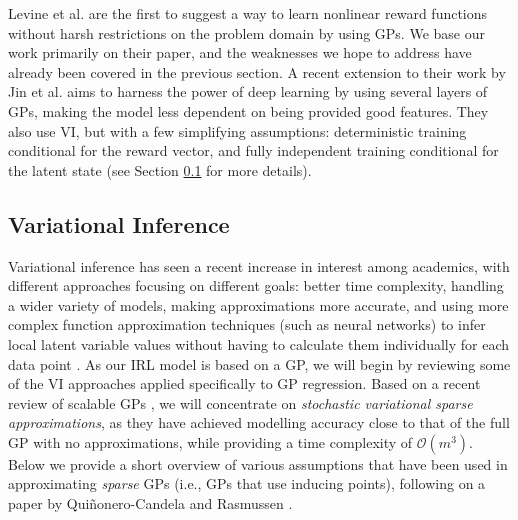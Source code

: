 \documentclass{mprop}
\theoremstyle{definition}
\begin{document}
Levine et al. \cite{DBLP:conf/nips/LevinePK11} are the first to suggest a way to
learn nonlinear reward functions without harsh restrictions on the problem
domain by using GPs. We base our work primarily on their paper, and the
weaknesses we hope to address have already been covered in the previous section.
A recent extension to their work by Jin et al. \cite{DBLP:conf/uai/JinDAS17}
aims to harness the power of deep learning by using several layers of GPs,
making the model less dependent on being provided good features. They also use
VI, but with a few simplifying assumptions: deterministic training conditional
for the reward vector, and fully independent training conditional for the latent
state (see Section \ref{sec:vi_literature} for more details).


\subsection{Variational Inference} \label{sec:vi_literature}

Variational inference has seen a recent increase in interest among academics,
with different approaches focusing on different goals: better time complexity,
handling a wider variety of models, making approximations more accurate, and
using more complex function approximation techniques (such as neural networks)
to infer local latent variable values without having to calculate them
individually for each data point \cite{DBLP:journals/corr/abs-1711-05597}. As
our IRL model is based on a GP, we will begin by reviewing some of the VI
approaches applied specifically to GP regression. Based on a recent review of
scalable GPs \cite{DBLP:journals/corr/abs-1711-05597}, we will concentrate on
\emph{stochastic variational sparse approximations}, as they have achieved
modelling accuracy close to that of the full GP with no approximations, while
providing a time complexity of $\mathcal{O}(m^3)$. Below we provide a short
overview of various assumptions that have been used in approximating
\emph{sparse} GPs (i.e., GPs that use inducing points), following on a paper by
Qui\~{n}onero-Candela and Rasmussen \cite{DBLP:journals/jmlr/CandelaR05}.
\end{document}
